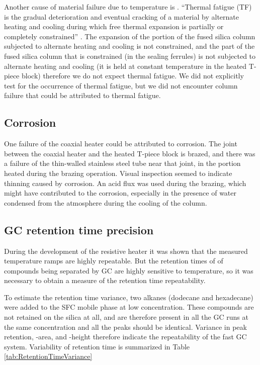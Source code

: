 Another cause of material failure due to temperature is . ``Thermal fatigue (TF) is the gradual deterioration and eventual
cracking of a material by alternate heating and cooling during which free
thermal expansion is partially or completely constrained'' \autocite{Rao2001}.
The expansion of the portion of the fused silica column subjected to alternate
heating and cooling is not constrained, and the part of the fused silica column
that is constrained (in the sealing ferrules) is not subjected to alternate
heating and cooling (it is held at constant temperature in the heated T-piece
block) therefore we do not expect thermal fatigue. We did not explicitly test
for the occurrence of thermal fatigue, but we did not encounter column failure
that could be attributed to thermal fatigue.

\subsection{Corrosion}
One failure of the coaxial heater could be attributed to corrosion. The joint
between the coaxial heater and the heated T-piece block is brazed, and there was
a failure of the thin-walled stainless steel tube near that joint, in the
portion heated during the brazing operation. Visual inspection seemed to
indicate thinning caused by corrosion. An acid flux was used during the brazing,
which might have contributed to the corrosion, especially in the presence of
water condensed from the atmosphere during the cooling of the column.

\subsection{GC retention time precision}

During the development of the resistive heater it was shown that the measured
temperature ramps are highly repeatable. But the retention times of of compounds
being separated by GC are highly sensitive to temperature, so it was necessary
to obtain a measure of the retention time repeatability.

To estimate the retention time variance, two alkanes (dodecane and hexadecane)
were added to the SFC mobile phase at low concentration. These compounds are not
retained on the silica at all, and are therefore present in all the GC runs at
the same concentration and all the peaks should be identical. Variance in peak
retention, -area, and -height therefore indicate the repeatability of the fast
GC system. Variability of retention time is summarized in Table
\ref{tab:RetentionTimeVariance}

